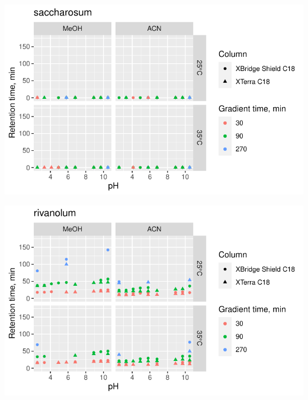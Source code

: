 \documentclass[
  letterpaper,
  DIV=11,
  numbers=noendperiod]{scrreprt}
\begin{document}
\includegraphics{index_files/figure-pdf/unnamed-chunk-4-186.pdf}

\includegraphics{index_files/figure-pdf/unnamed-chunk-4-187.pdf}
\end{document}
